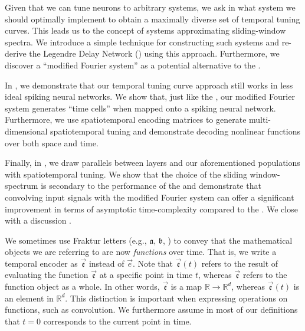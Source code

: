 Given that we can tune neurons to arbitrary \LTI systems, we ask in  what \LTI system we should optimally implement to obtain a maximally diverse set of temporal tuning curves.
This leads us to the concept of \LTI systems approximating sliding-window spectra.
We introduce a simple technique for constructing such \LTI systems and re-derive the Legendre Delay Network (\LDN) using this approach.
Furthermore, we discover a \enquote{modified Fourier system} as a potential alternative to the \LDN.

In , we demonstrate that our temporal tuning curve approach still works in less ideal spiking neural networks.
We show that, just like the \LDN, our modified Fourier system generates \enquote{time cells} when mapped onto a spiking neural network.
Furthermore, we use spatiotemporal encoding matrices to generate multi-dimensional spatiotemporal tuning and demonstrate decoding nonlinear functions over both space and time.

Finally, in , we draw parallels between \LMU layers and our aforementioned \NEF populations with spatiotemporal tuning.
We show that the choice of the sliding window-spectrum is secondary to the performance of the \LMU and demonstrate that convolving input signals with the modified Fourier system can offer a significant improvement in terms of asymptotic time-complexity compared to the \LDN.
We close with a discussion .

\begin{Notation}
We sometimes use Fraktur letters (e.g., $\mathfrak{a}$, $\mathfrak{b}$, \textellipsis) to convey that the mathematical objects we are referring to are now \emph{functions} over time.
That is, we write a temporal encoder as $\vec{\mathfrak{e}}$ instead of $\vec e$.
Note that $\vec{\mathfrak{e}}(t)$ refers to the result of evaluating the function $\vec{\mathfrak{e}}$ at a specific point in time $t$, whereas $\vec{\mathfrak{e}}$ refers to the function object as a whole.
In other words, $\vec{\mathfrak{e}}$ is a map $\mathbb{R} \longrightarrow \mathbb{R}^d$, whereas $\vec{\mathfrak{e}}(t)$ is an element in $\mathbb{R}^d$.
This distinction is important when expressing operations on functions, such as convolution.
We furthermore assume in most of our definitions that $t = 0$ corresponds to the current point in time.
\end{Notation}
